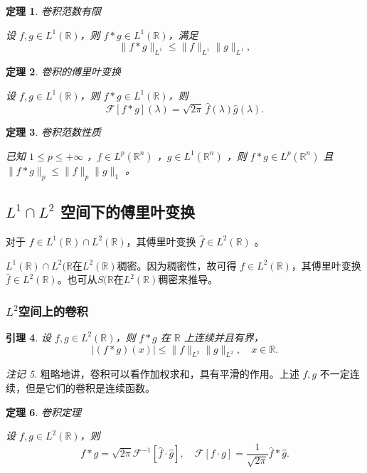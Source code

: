 \documentclass[12pt,a4paper]{article}
\theoremstyle{plain}
\newtheorem{theorem}{定理}[section]
\newtheorem{lemma}[theorem]{引理}
\theoremstyle{definition}
\theoremstyle{remark}
\newtheorem{remark}[theorem]{注记}
\begin{document}
\begin{theorem}卷积范数有限
	
	设 \( f, g \in L^1(\mathbb{R}) \)，则 \( f * g \in L^1(\mathbb{R}) \)，满足
	\[
	\| f * g \|_{L^1} \leq \| f \|_{L^1} \| g \|_{L^1},
	\]

\end{theorem}

\begin{theorem}卷积的傅里叶变换
	
	设 \( f, g \in L^1(\mathbb{R}) \)，则 \( f * g \in L^1(\mathbb{R}) \)，则
	\[
	\mathcal{F}[f * g](\lambda) = \sqrt{2\pi} \, \widehat{f}(\lambda) \widehat{g}(\lambda).
	\]
\end{theorem}

\begin{theorem}卷积范数性质
	
已知 \(1\leq p\leq +\infty\) ，\(f\in L^p(\mathbb{R}^n)\) ，\(g\in L^1(\mathbb{R}^n)\) ，则 \(f * g\in L^p(\mathbb{R}^n)\) 且 \(\|f * g\|_p\leq\|f\|_p\|g\|_1\) 。
\end{theorem}

\subsection{$L^1 \cap L^2$ 空间下的傅里叶变换}
对于 $f \in L^1(\mathbb{R}) \cap L^2(\mathbb{R})$，其傅里叶变换 $\hat{f} \in L^2(\mathbb{R})$ 。

$L^1(\mathbb{R}) \cap L^2(\mathbb{R}$在$L^2(\mathbb{R})$稠密。因为稠密性，故可得 $f \in L^2(\mathbb{R})$，其傅里叶变换 $\hat{f} \in L^2(\mathbb{R})$。也可从$S(\mathbb{R}$在$L^2(\mathbb{R})$稠密来推导。

\subsubsection{$L^2$空间上的卷积}
\begin{lemma}
	设 \( f, g \in L^2(\mathbb{R}) \)，则 \( f * g \) 在 \(\mathbb{R}\) 上连续并且有界，
	\[
	|(f * g)(x)| \leq \| f \|_{L^2} \| g \|_{L^2}, \quad x \in \mathbb{R}.
	\]
\end{lemma}

\begin{remark}
	粗略地讲，卷积可以看作加权求和，具有平滑的作用。上述 \( f, g \) 不一定连续，但是它们的卷积是连续函数。
\end{remark}

\begin{theorem}卷积定理
	
	设 \( f, g \in L^2(\mathbb{R}) \)，则
	\[
	f * g = \sqrt{2\pi} \mathcal{F}^{-1}[\hat{f} \cdot \hat{g}], \quad \mathcal{F}[f \cdot g] = \frac{1}{\sqrt{2\pi}} \hat{f} * \hat{g}.
	\]
\end{theorem}
\end{document}
